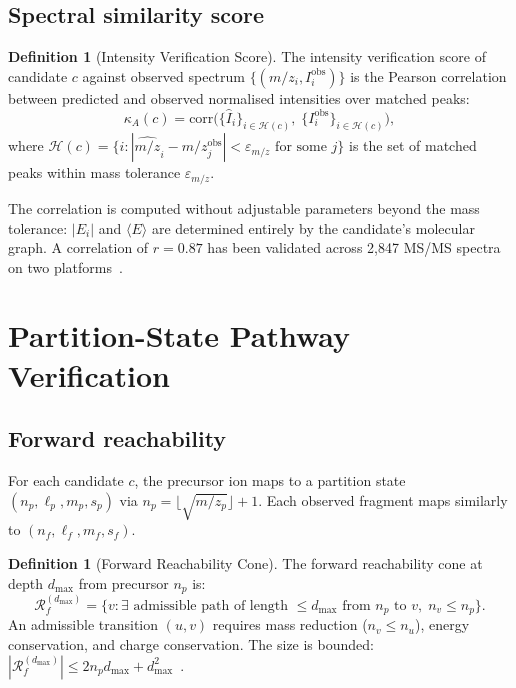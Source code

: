 \documentclass[twocolumn,10pt,a4paper]{article}
\theoremstyle{thmstyle}
\theoremstyle{definition}
\newtheorem{definition}[theorem]{Definition}
\theoremstyle{remark}
\newcommand{\calR}{\mathcal{R}}
\newcommand{\calH}{\mathcal{H}}
\begin{document}
\subsection{Spectral similarity score}

\begin{definition}[Intensity Verification Score]
\label{def:intensity-score}
The intensity verification score of candidate $c$ against observed
spectrum $\{(m/z_i, I_i^{\mathrm{obs}})\}$ is the Pearson correlation
between predicted and observed normalised intensities over matched
peaks:
\begin{equation}
\kappa_A(c) = \mathrm{corr}\!\bigl(
  \{\hat{I}_i\}_{i \in \calH(c)},\;
  \{I_i^{\mathrm{obs}}\}_{i \in \calH(c)}
\bigr),
\label{eq:kappa-a}
\end{equation}
where $\calH(c) = \{i : |\hat{m/z}_i - m/z_j^{\mathrm{obs}}| <
\varepsilon_{m/z} \text{ for some } j\}$ is the set of matched peaks
within mass tolerance $\varepsilon_{m/z}$.
\end{definition}

The correlation is computed without adjustable parameters beyond the
mass tolerance: $|E_i|$ and $\langle E \rangle$ are determined entirely
by the candidate's molecular graph. A correlation of $r = 0.87$ has
been validated across 2{,}847 MS/MS spectra on two
platforms~\citep{sachikonye2024categorical}.


\section{Partition-State Pathway Verification}
\label{sec:pathway}

\subsection{Forward reachability}

For each candidate $c$, the precursor ion maps to a partition state
$(n_p, \ell_p, m_p, s_p)$ via
$n_p = \lfloor\sqrt{m/z_p}\rfloor + 1$. Each observed fragment maps
similarly to $(n_f, \ell_f, m_f, s_f)$.

\begin{definition}[Forward Reachability Cone]
\label{def:forward-cone}
The forward reachability cone at depth $d_{\max}$ from precursor $n_p$
is:
\begin{equation}
\calR_f^{(d_{\max})} = \bigl\{v : \exists \text{ admissible path of
length } \le d_{\max} \text{ from } n_p \text{ to } v,\;
n_v \le n_p\bigr\}.
\end{equation}
An admissible transition $(u, v)$ requires mass reduction
($n_v \le n_u$), energy conservation, and charge conservation. The
size is bounded: $|\calR_f^{(d_{\max})}| \le 2n_p d_{\max} +
d_{\max}^2$~\citep{sachikonye2024partition}.
\end{definition}
\end{document}
